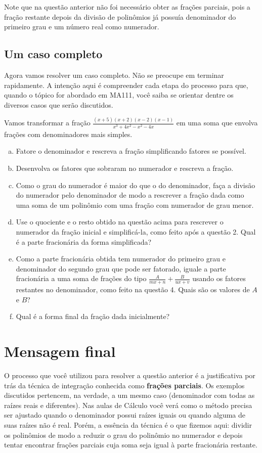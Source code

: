 \documentclass[main_estudante.tex]{subfiles}
\begin{document}
Note que na questão anterior não foi necessário obter as frações parciais, pois a fração restante depois da divisão de polinômios já possuía denominador do primeiro grau e um número real como numerador.

\subsection*{Um caso completo}

Agora vamos resolver um caso completo. Não se preocupe em terminar rapidamente. A intenção aqui é compreender cada etapa do processo para que, quando o tópico for abordado em MA111, você saiba se orientar dentre os diversos casos que serão discutidos.

\begin{questao}
Vamos transformar a fração $\frac{(x+5)(x+2)(x-2)(x-1)}{x^3+4x^2-x^2-4x}$ em uma soma que envolva frações com denominadores mais simples.
\begin{enumerate}[a)]
\item Fatore o denominador e rescreva a fração simplificando fatores se possível.
\item Desenvolva os fatores que sobraram no numerador e rescreva a fração.
\item Como o grau do numerador é maior do que o do denominador, faça a divisão do numerador pelo denominador de modo a rescrever a fração dada como uma soma de um polinômio com uma fração com numerador de grau menor.
\item Use o quociente e o resto obtido na questão acima para rescrever o numerador da fração inicial e simplificá-la, como feito após a questão 2. Qual é a parte fracionária da forma simplificada?
\item Como a parte fracionária obtida tem numerador do primeiro grau e denominador do segundo grau que pode ser fatorado, iguale a parte fracionária a uma soma de frações do tipo $\frac{A}{mx+n}+\frac{B}{ux+v}$ usando os fatores restantes no denominador, como feito na questão 4. Quais são os valores de $A$ e $B$?
\item Qual é a forma final da fração dada inicialmente?
\end{enumerate}
\end{questao}

\section{Mensagem final}

O processo que você utilizou para resolver a questão anterior é a justificativa por trás da técnica de integração conhecida como \textbf{frações parciais}. Os exemplos discutidos pertencem, na verdade, a um mesmo caso (denominador com todas as raízes reais e diferentes). Nas aulas de Cálculo você verá como o método precisa ser ajustado quando o denominador possui raízes iguais ou quando alguma de suas raízes não é real. Porém, a essência da técnica é o que fizemos aqui: dividir os polinômios de modo a reduzir o grau do polinômio no numerador e depois tentar encontrar frações parciais cuja soma seja igual à parte fracionária restante.
\end{document}
